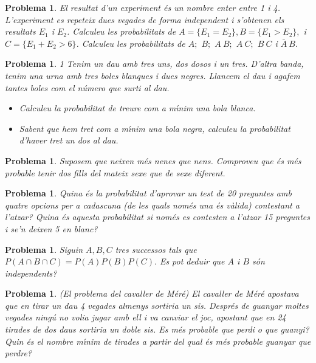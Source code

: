 \documentclass[11pt]{article}
\newcounter{prbcont}
\newtheorem{problema}[prbcont]{Problema}
\begin{document}
\begin{problema}
El resultat d'un experiment \'es un nombre enter entre 1 i 4. L'experiment es repeteix dues
vegades de forma independent i s'obtenen els resultats $E_1$ i $E_2$. Calculeu les probabilitats
de $A = \{E_1 = E_2\}, B = \{E_1 > E_2 \},$ i $C = \{E_1 + E_2 >6\}$. Calculeu les probabilitats de
$A;$ $B;$ $A \ B;$ $A \ C;$ $B \ C$ i $\bar{A} \ B.$
\end{problema}

\begin{problema}                                                                               1   
Tenim un dau amb tres uns, dos dosos i un tres. D'altra banda, tenim una urna amb tres boles blanques i dues negres. Llancem el dau i agafem tantes boles com el n\'umero que surti al dau.
\begin{itemize}
\item [(a)] Calculeu la probabilitat de treure com a m\'{\i}nim una bola blanca.
\item [(b)] Sabent que hem tret com a m\'{\i}nim una bola negra, calculeu la probabilitat d'haver tret
un dos al dau.
\end{itemize}
\end{problema}

\begin{problema}
Suposem que neixen m\'es nenes que nens. Comproveu que \'es m\'es probable tenir dos fills
del mateix sexe que de sexe diferent.
\end{problema}

\begin{problema}
Quina \'es la probabilitat d'aprovar un test de 20 preguntes amb quatre opcions per a
cadascuna (de les quals nom\'es una \'es v\`alida) contestant a l'atzar? Quina \'es aquesta probabilitat si nom\'es es contesten a l'atzar 15 preguntes i se'n deixen 5 en blanc?
\end{problema}

\begin{problema}   
\item Siguin $A,B,C$ tres successos tals que $P(A\cap B \cap C)=P(A)P(B)P(C).$ Es pot deduir que $A$ i $B$ s\'on independents?
\end{problema}

\begin{problema}
(El problema del cavaller de M\'er\'e) El cavaller de M\'er\'e apostava que en tirar un dau 4 vegades almenys sortiria un sis. Despr\'es de guanyar moltes vegades ning\'u no volia jugar amb ell i va canviar el joc, apostant que en 24 tirades de dos daus sortiria un doble sis. Es m\'es probable que perdi o que guanyi? Quin \'es el nombre m\'{\i}nim de tirades a partir del qual \'es m\'es probable guanyar que perdre?
\end{problema}
\end{document}
